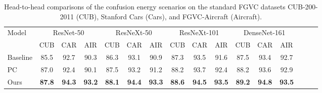 \documentclass{article}
\begin{document}
\begin{table*}[ht!]
\caption{Head-to-head comparisons of the confusion energy scenarios on the standard FGVC datasets CUB-200-2011 (CUB), Stanford Cars (Cars), and FGVC-Aircraft (Aircraft).}
\label{tab:fgvc_ab}
\centering
\begin{tabular}{lccccccccccccccc}
\toprule
\multirow{2}{*}{Model} & \multicolumn{3}{c}{ResNet-50} & \multicolumn{3}{c}{ResNeXt-50} & \multicolumn{3}{c}{ResNeXt-101} & \multicolumn{3}{c}{DenseNet-161}\\
        \cmidrule(lr){2-4}
        \cmidrule(lr){5-7}
        \cmidrule(lr){8-10}
        \cmidrule(lr){11-13}
        \cmidrule(lr){14-16}
                    & CUB  & CAR  & AIR  & CUB  & CAR  & AIR  & CUB  & CAR  & AIR & CUB  & CAR  & AIR \\
        \midrule
        \midrule
        Baseline    & 85.5 & 92.7 & 90.3 & 86.3 & 93.1 & 90.9 & 87.3 & 93.5 & 91.6 & 87.5 & 93.4 & 92.7 \\
        PC          & 87.0 & 92.4 & 90.1 & 87.5 & 93.2 & 91.2 & 88.2 & 93.7 & 92.4 & 88.2 & 93.6 & 92.9 \\
        \midrule
        \midrule
        Ours        & \bf 87.8 & \bf 94.3 & \bf 93.2 & \bf 88.1 & \bf 94.4 & \bf 93.3 & \bf 88.6 & \bf 94.5 & \bf 93.5 & \bf 89.2 & \bf 94.8 & \bf 93.5 \\
        \bottomrule
\end{tabular}
\vspace{-5pt}
\end{table*}
\end{document}
